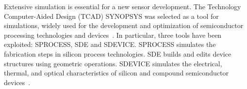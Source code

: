 
Extensive simulation is essential for a new sensor development. 
The  Technology Computer-Aided Design (TCAD) SYNOPSYS was selected  as a tool for simulations, widely used for the development and optimization of semiconductor processing technologies and devices~\cite{Synopsys}. 
In particular, three tools have been exploited: SPROCESS, SDE and SDEVICE. 
SPROCESS simulates the fabrication steps in silicon process technologies. 
SDE builds and edits device structures using geometric operations. 
SDEVICE simulates the electrical, thermal, and optical characteristics of silicon and compound semiconductor devices~\cite{SynopsysIncG-2012.06}.

\begin{figure}[t]
\begin{minipage}[h]{0.39\linewidth}
\end{minipage}
\begin{minipage}[h]{0.39\linewidth}

\end{minipage}
\end{figure}
